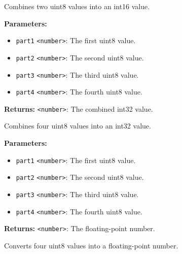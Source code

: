 \documentclass[12pt,a4paper]{article}
\begin{document}
\noindent Combines two uint8 values into an int16 value.

\vspace{5mm}
\noindent {}


\noindent \textbf{Parameters:}
\begin{itemize}
  \item \texttt{part1} \texttt{<number>}: The first uint8 value.
  \item \texttt{part2} \texttt{<number>}: The second uint8 value.
  \item \texttt{part3} \texttt{<number>}: The third uint8 value.
  \item \texttt{part4} \texttt{<number>}: The fourth uint8 value.
\end{itemize}

\noindent \textbf{Returns:} \texttt{<number>}: The combined int32 value.

\noindent Combines four uint8 values into an int32 value.

\vspace{5mm}
\noindent {}


\noindent \textbf{Parameters:}
\begin{itemize}
  \item \texttt{part1} \texttt{<number>}: The first uint8 value.
  \item \texttt{part2} \texttt{<number>}: The second uint8 value.
  \item \texttt{part3} \texttt{<number>}: The third uint8 value.
  \item \texttt{part4} \texttt{<number>}: The fourth uint8 value.
\end{itemize}

\noindent \textbf{Returns:} \texttt{<number>}: The floating-point number.

\noindent Converts four uint8 values into a floating-point number.

\vspace{5mm}
\noindent {}
\end{document}
